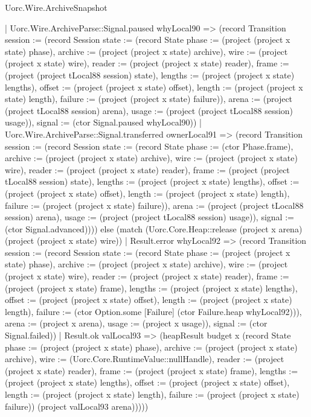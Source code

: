 \begin{lexlean}{Uorc.Wire.ArchiveSnapshot}
\begin{semanticmodule}
{        | Uorc.Wire.ArchiveParse::Signal.paused whyLocal90 => (record Transition {session := (record Session {state := (record State {phase := (project (project x state) phase), archive := (project (project x state) archive), wire := (project (project x state) wire), reader := (project (project x state) reader), frame := (project (project tLocal88 session) state), lengths := (project (project x state) lengths), offset := (project (project x state) offset), length := (project (project x state) length), failure := (project (project x state) failure)}), arena := (project (project tLocal88 session) arena), usage := (project (project tLocal88 session) usage)}), signal := (ctor Signal.paused whyLocal90)})
        | Uorc.Wire.ArchiveParse::Signal.transferred ownerLocal91 => (record Transition {session := (record Session {state := (record State {phase := (ctor Phase.frame), archive := (project (project x state) archive), wire := (project (project x state) wire), reader := (project (project x state) reader), frame := (project (project tLocal88 session) state), lengths := (project (project x state) lengths), offset := (project (project x state) offset), length := (project (project x state) length), failure := (project (project x state) failure)}), arena := (project (project tLocal88 session) arena), usage := (project (project tLocal88 session) usage)}), signal := (ctor Signal.advanced)}))) else (match (Uorc.Core.Heap::release (project x arena) (project (project x state) wire))
        | Result.error whyLocal92 => (record Transition {session := (record Session {state := (record State {phase := (project (project x state) phase), archive := (project (project x state) archive), wire := (project (project x state) wire), reader := (project (project x state) reader), frame := (project (project x state) frame), lengths := (project (project x state) lengths), offset := (project (project x state) offset), length := (project (project x state) length), failure := (ctor Option.some [Failure] (ctor Failure.heap whyLocal92))}), arena := (project x arena), usage := (project x usage)}), signal := (ctor Signal.failed)})
        | Result.ok valLocal93 => (heapResult budget x (record State {phase := (project (project x state) phase), archive := (project (project x state) archive), wire := (Uorc.Core.RuntimeValue::nullHandle), reader := (project (project x state) reader), frame := (project (project x state) frame), lengths := (project (project x state) lengths), offset := (project (project x state) offset), length := (project (project x state) length), failure := (project (project x state) failure)}) (project valLocal93 arena)))))
}
\end{semanticmodule}
\end{lexlean}
